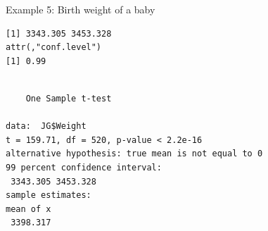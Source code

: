 \documentclass[
  ignorenonframetext,
]{beamer}
\newenvironment{Shaded}{\begin{snugshade}}{\end{snugshade}}
\newcommand{\AttributeTok}[1]{\textcolor[rgb]{0.13,0.29,0.53}{#1}}
\newcommand{\CommentTok}[1]{\textcolor[rgb]{0.56,0.35,0.01}{\textit{#1}}}
\newcommand{\FloatTok}[1]{\textcolor[rgb]{0.00,0.00,0.81}{#1}}
\newcommand{\FunctionTok}[1]{\textcolor[rgb]{0.13,0.29,0.53}{\textbf{#1}}}
\newcommand{\NormalTok}[1]{#1}
\newcommand{\OtherTok}[1]{\textcolor[rgb]{0.56,0.35,0.01}{#1}}
\newcommand{\SpecialCharTok}[1]{\textcolor[rgb]{0.81,0.36,0.00}{\textbf{#1}}}
\newcommand{\StringTok}[1]{\textcolor[rgb]{0.31,0.60,0.02}{#1}}
\begin{document}
\begin{frame}[fragile]{Example 5: Birth weight of a baby}
\protect\hypertarget{example-5-birth-weight-of-a-baby-5}{}
\tiny

\begin{Shaded}
\end{Shaded}

\begin{verbatim}
[1] 3343.305 3453.328
attr(,"conf.level")
[1] 0.99
\end{verbatim}

\begin{Shaded}
\end{Shaded}

\begin{verbatim}

    One Sample t-test

data:  JG$Weight
t = 159.71, df = 520, p-value < 2.2e-16
alternative hypothesis: true mean is not equal to 0
99 percent confidence interval:
 3343.305 3453.328
sample estimates:
mean of x 
 3398.317 
\end{verbatim}

\normalsize
\end{frame}
\end{document}
